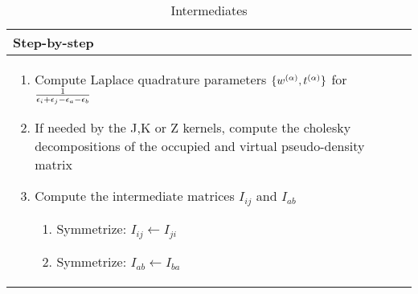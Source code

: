 \begin{table}
\begin{tabular}{p{}}
\hline
Step-by-step \\ \hline
\begin{enumerate}
\item Compute Laplace quadrature parameters $\{w^{(\alpha)},t^{(\alpha)}\}$ for $\frac{1}{\epsilon_i + \epsilon_j - \epsilon_a - \epsilon_b}$
\item If needed by the J,K or Z kernels, compute the cholesky decompositions of the occupied and virtual pseudo-density matrix 
\item Compute the intermediate matrices $I_{ij}$ and $I_{ab}$
\begin{algorithm}[H]
\For{\forcond}{
	\begin{enumerate}
		\itemR\label{GMATINTERMED}
	$G\pa_{XY} \leftarrow M_{XR} \calZ\left\lbrace P\pa,Q\pa\right\rbrace_{RS} M_{SR}$
	\itemR\label{IVVINTERMED}	
	$I_{ab} \leftarrow - \frac{c_{os}}{2} C_{\nu b} \sum_\alpha C_{\mu a} \mid w\pa \mid^{1/4} e^{-\eps_a t\pa} \calK\left\lbrace P\pa,G\pa\right\rbrace_{\mu\nu}$
	\itemR\label{IOOINTERMED}
	$I_{ij} \leftarrow - \frac{c_{os}}{2} C_{\nu j} \sum_\alpha C_{\mu i} \mid w\pa \mid^{1/4} e^{ \eps_i t\pa} \calK\left\lbrace Q\pa,G\pa\right\rbrace_{\mu\nu}$ 
	\end{enumerate}
}
\begin{enumerate}
\setcounter{enumii}{\theISTEP}
\item\label{AntisymIOO}
Symmetrize: $I_{ij} \leftarrow I_{ji}$
\item\label{AntisymIVV}
Symmetrize: $I_{ab} \leftarrow I_{ba}$
\end{enumerate}
\end{algorithm}
%
\setcounter{ISTEP}{0}
%
\end{enumerate}
\\ \hline
\end{tabular}
\caption{Intermediates}
\label{AODFSOSADC2INTERMEDIATES}
\end{table}
%
